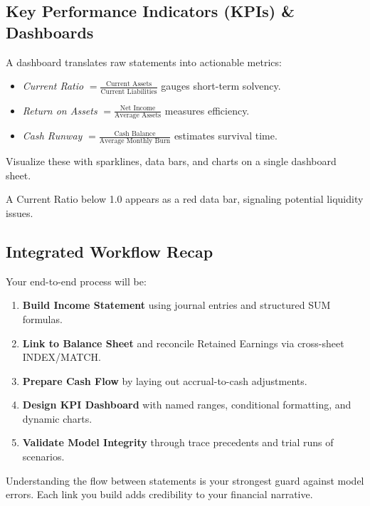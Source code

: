\subsection{Key Performance Indicators (KPIs) \& Dashboards}
A dashboard translates raw statements into actionable metrics:

\begin{itemize}
  \item \emph{Current Ratio} \(=\frac{\text{Current Assets}}{\text{Current Liabilities}}\) gauges short-term solvency.
  \item \emph{Return on Assets} \(=\frac{\text{Net Income}}{\text{Average Assets}}\) measures efficiency.
  \item \emph{Cash Runway} \(=\frac{\text{Cash Balance}}{\text{Average Monthly Burn}}\) estimates survival time.
\end{itemize}

Visualize these with sparklines, data bars, and charts on a single dashboard sheet.

\begin{Example}
A Current Ratio below 1.0 appears as a red data bar, signaling potential liquidity issues.
\end{Example}

\subsection{Integrated Workflow Recap}
Your end-to-end process will be:

\begin{enumerate}
  \item \textbf{Build Income Statement} using journal entries and structured SUM formulas.
  \item \textbf{Link to Balance Sheet} and reconcile Retained Earnings via cross-sheet INDEX/MATCH.
  \item \textbf{Prepare Cash Flow} by laying out accrual-to-cash adjustments.
  \item \textbf{Design KPI Dashboard} with named ranges, conditional formatting, and dynamic charts.
  \item \textbf{Validate Model Integrity} through trace precedents and trial runs of scenarios.
\end{enumerate}

\begin{Important}
Understanding the flow between statements is your strongest guard against model errors. Each link you build adds credibility to your financial narrative.
\end{Important}


\clearpage
